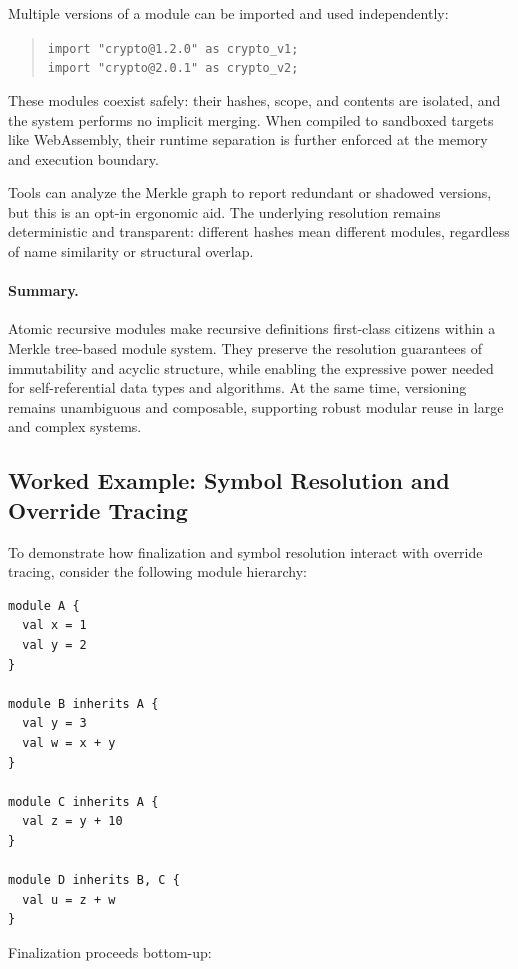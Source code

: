 \documentclass[sigplan,screen]{acmart}
\begin{document}
Multiple versions of a module can be imported and used independently:

\begin{quote}
	\texttt{import "crypto@1.2.0" as crypto\_v1;}\\
	\texttt{import "crypto@2.0.1" as crypto\_v2;}
\end{quote}

These modules coexist safely: their hashes, scope, and contents are isolated, and the system performs no implicit merging. When compiled to sandboxed targets like WebAssembly, their runtime separation is further enforced at the memory and execution boundary.

Tools can analyze the Merkle graph to report redundant or shadowed versions, but this is an opt-in ergonomic aid. The underlying resolution remains deterministic and transparent: different hashes mean different modules, regardless of name similarity or structural overlap.

\paragraph{Summary.}
Atomic recursive modules make recursive definitions first-class citizens within a Merkle tree-based module system. They preserve the resolution guarantees of immutability and acyclic structure, while enabling the expressive power needed for self-referential data types and algorithms. At the same time, versioning remains unambiguous and composable, supporting robust modular reuse in large and complex systems.

\subsection{Worked Example: Symbol Resolution and Override Tracing}

To demonstrate how finalization and symbol resolution interact with override tracing, consider the following module hierarchy:

\begin{lstlisting}[caption=Module definitions for resolution example]
module A {
  val x = 1
  val y = 2
}

module B inherits A {
  val y = 3
  val w = x + y
}

module C inherits A {
  val z = y + 10
}

module D inherits B, C {
  val u = z + w
}
\end{lstlisting}

Finalization proceeds bottom-up:
\end{document}
